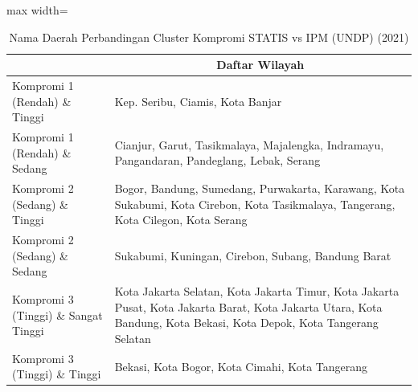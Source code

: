 \begin{table}[H]
\centering
\caption{Nama Daerah Perbandingan Cluster Kompromi STATIS vs IPM (UNDP) (2021)} \label{tab:app1comp_ipm_name_2021}
\begin{adjustbox}{max width=\textwidth}
\begin{tabular}{|>{\centering\arraybackslash}p{4cm}|p{10cm}|}
\hline
\multicolumn{1}{|c|}{\textbf{Kategori}} & \multicolumn{1}{c|}{\textbf{Daftar Wilayah}} \\
\hline
Kompromi 1 (Rendah) \& Tinggi & Kep. Seribu, Ciamis, Kota Banjar \\
\hline
Kompromi 1 (Rendah) \& Sedang & Cianjur, Garut, Tasikmalaya, Majalengka, Indramayu, Pangandaran, Pandeglang, Lebak, Serang \\
\hline
Kompromi 2 (Sedang) \& Tinggi & Bogor, Bandung, Sumedang, Purwakarta, Karawang, Kota Sukabumi, Kota Cirebon, Kota Tasikmalaya, Tangerang, Kota Cilegon, Kota Serang \\
\hline
Kompromi 2 (Sedang) \& Sedang & Sukabumi, Kuningan, Cirebon, Subang, Bandung Barat \\
\hline
Kompromi 3 (Tinggi) \& Sangat Tinggi & Kota Jakarta Selatan, Kota Jakarta Timur, Kota Jakarta Pusat, Kota Jakarta Barat, Kota Jakarta Utara, Kota Bandung, Kota Bekasi, Kota Depok, Kota Tangerang Selatan \\
\hline
Kompromi 3 (Tinggi) \& Tinggi & Bekasi, Kota Bogor, Kota Cimahi, Kota Tangerang \\
\hline
\end{tabular}
\end{adjustbox}
\end{table}